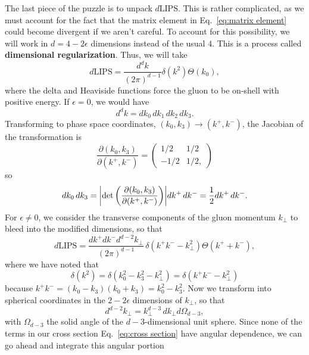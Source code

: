 \documentclass[11pt,twoside,reqno]{amsart}
\theoremstyle{plain}
\theoremstyle{remark}
\theoremstyle{definition}
\theoremstyle{remark}
\theoremstyle{definition}
\theoremstyle{definition}
\newcommand{\LIPS}{\mathrm{LIPS}}
\begin{document}
The last piece of the puzzle is to unpack $d\LIPS$. This is rather complicated, as we must account for the fact that the matrix element in Eq.\ \ref{eq:matrix element} could become divergent if we aren't careful. To account for this possibility, we will work in $d = 4 - 2\epsilon$ dimensions instead of the usual $4$. This is a process called \textbf{dimensional regularization}. Thus, we will take
\begin{equation}
	d\LIPS = \frac{d^d k}{(2\pi)^{d - 1}} \delta(k^2) \Theta(k_0),
\end{equation}
where the delta and Heaviside functions force the gluon to be on-shell with positive energy. If $\epsilon = 0$, we would have
\begin{equation}
	d^d k = dk_0\,dk_1\,dk_2\,dk_3.
\end{equation}
Transforming to phase space coordinates, $(k_0, k_3) \to (k^+, k^-)$, the Jacobian of the transformation is
\begin{equation}
	\frac{\partial(k_0, k_3)}{\partial(k^+, k^-)} = \begin{pmatrix}
		1/2 & 1/2 \\ -1/2 & 1/2,
	\end{pmatrix}
\end{equation}
so
\begin{equation}
	dk_0\,dk_3 = \abs{\det\qty(\frac{\partial(k_0, k_3)}{\partial(k^+, k^-)})} dk^+\,dk^- = \frac{1}{2}dk^+\,dk^-.
\end{equation}
For $\epsilon \neq 0$, we consider the transverse components of the gluon momentum $k_\perp$ to bleed into the modified dimensions, so that
\begin{equation}
	d\LIPS = \frac{dk^+ dk^- d^{d - 2}k_\perp}{(2\pi)^{d - 1}}\,\delta(k^+ k^- - k_\perp^2)\Theta(k^+ + k^-),
\end{equation}
where we have noted that
\begin{equation}
	\delta(k^2) = \delta(k_0^2 - k_3^2 - k_\perp^2) = \delta(k^+ k^- - k_\perp^2)
\end{equation}
because $k^+ k^- = (k_0 - k_3)(k_0 + k_3) = k_0^2  - k_3^2$. Now we transform into spherical coordinates in the $2 - 2\epsilon$ dimensions of $k_\perp$, so that
\begin{equation}
	d^{d - 2} k_\perp = k_\perp^{d - 3} \, dk_\perp d\Omega_{d - 3},
\end{equation}
with $\Omega_{d - 3}$ the solid angle of the $d - 3$-dimensional unit sphere. Since none of the terms in our cross section Eq.\ \ref{eq:cross section} have angular dependence, we can go ahead and integrate this angular portion
\end{document}
